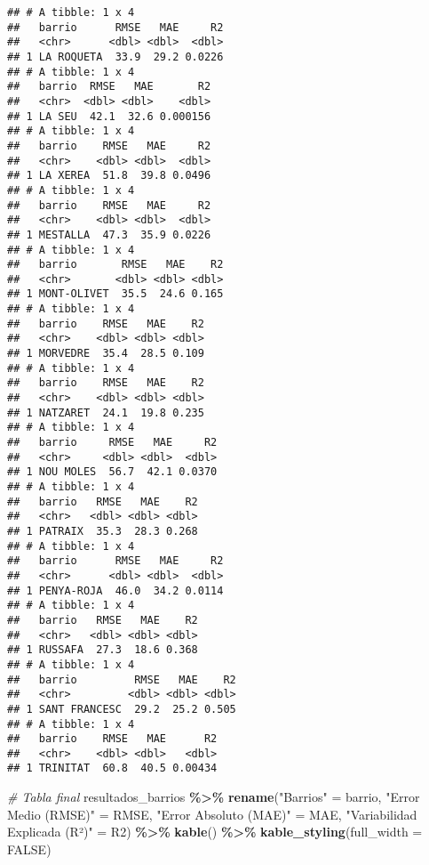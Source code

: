 \documentclass[
]{article}
\newenvironment{Shaded}{\begin{snugshade}}{\end{snugshade}}
\newcommand{\AttributeTok}[1]{\textcolor[rgb]{0.13,0.29,0.53}{#1}}
\newcommand{\CommentTok}[1]{\textcolor[rgb]{0.56,0.35,0.01}{\textit{#1}}}
\newcommand{\ConstantTok}[1]{\textcolor[rgb]{0.56,0.35,0.01}{#1}}
\newcommand{\FunctionTok}[1]{\textcolor[rgb]{0.13,0.29,0.53}{\textbf{#1}}}
\newcommand{\NormalTok}[1]{#1}
\newcommand{\OtherTok}[1]{\textcolor[rgb]{0.56,0.35,0.01}{#1}}
\newcommand{\SpecialCharTok}[1]{\textcolor[rgb]{0.81,0.36,0.00}{\textbf{#1}}}
\newcommand{\StringTok}[1]{\textcolor[rgb]{0.31,0.60,0.02}{#1}}
\begin{document}
\begin{verbatim}
## # A tibble: 1 x 4
##   barrio      RMSE   MAE     R2
##   <chr>      <dbl> <dbl>  <dbl>
## 1 LA ROQUETA  33.9  29.2 0.0226
## # A tibble: 1 x 4
##   barrio  RMSE   MAE       R2
##   <chr>  <dbl> <dbl>    <dbl>
## 1 LA SEU  42.1  32.6 0.000156
## # A tibble: 1 x 4
##   barrio    RMSE   MAE     R2
##   <chr>    <dbl> <dbl>  <dbl>
## 1 LA XEREA  51.8  39.8 0.0496
## # A tibble: 1 x 4
##   barrio    RMSE   MAE     R2
##   <chr>    <dbl> <dbl>  <dbl>
## 1 MESTALLA  47.3  35.9 0.0226
## # A tibble: 1 x 4
##   barrio       RMSE   MAE    R2
##   <chr>       <dbl> <dbl> <dbl>
## 1 MONT-OLIVET  35.5  24.6 0.165
## # A tibble: 1 x 4
##   barrio    RMSE   MAE    R2
##   <chr>    <dbl> <dbl> <dbl>
## 1 MORVEDRE  35.4  28.5 0.109
## # A tibble: 1 x 4
##   barrio    RMSE   MAE    R2
##   <chr>    <dbl> <dbl> <dbl>
## 1 NATZARET  24.1  19.8 0.235
## # A tibble: 1 x 4
##   barrio     RMSE   MAE     R2
##   <chr>     <dbl> <dbl>  <dbl>
## 1 NOU MOLES  56.7  42.1 0.0370
## # A tibble: 1 x 4
##   barrio   RMSE   MAE    R2
##   <chr>   <dbl> <dbl> <dbl>
## 1 PATRAIX  35.3  28.3 0.268
## # A tibble: 1 x 4
##   barrio      RMSE   MAE     R2
##   <chr>      <dbl> <dbl>  <dbl>
## 1 PENYA-ROJA  46.0  34.2 0.0114
## # A tibble: 1 x 4
##   barrio   RMSE   MAE    R2
##   <chr>   <dbl> <dbl> <dbl>
## 1 RUSSAFA  27.3  18.6 0.368
## # A tibble: 1 x 4
##   barrio         RMSE   MAE    R2
##   <chr>         <dbl> <dbl> <dbl>
## 1 SANT FRANCESC  29.2  25.2 0.505
## # A tibble: 1 x 4
##   barrio    RMSE   MAE      R2
##   <chr>    <dbl> <dbl>   <dbl>
## 1 TRINITAT  60.8  40.5 0.00434
\end{verbatim}

\begin{Shaded}
\begin{Highlighting}[]
\CommentTok{\# Tabla final}
\NormalTok{resultados\_barrios }\SpecialCharTok{\%\textgreater{}\%}
  \FunctionTok{rename}\NormalTok{(}\StringTok{"Barrios"} \OtherTok{=}\NormalTok{ barrio, }\StringTok{"Error Medio (RMSE)"} \OtherTok{=}\NormalTok{ RMSE,}
         \StringTok{"Error Absoluto (MAE)"} \OtherTok{=}\NormalTok{ MAE, }\StringTok{"Variabilidad Explicada (R²)"} \OtherTok{=}\NormalTok{ R2) }\SpecialCharTok{\%\textgreater{}\%}
  \FunctionTok{kable}\NormalTok{() }\SpecialCharTok{\%\textgreater{}\%}
  \FunctionTok{kable\_styling}\NormalTok{(}\AttributeTok{full\_width =} \ConstantTok{FALSE}\NormalTok{)}
\end{Highlighting}
\end{Shaded}
\end{document}
